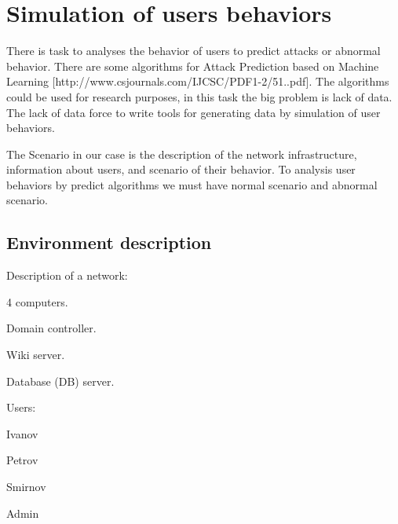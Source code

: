 %

%
%




\section{Simulation of users behaviors}
There is task to analyses the behavior of users to predict attacks or abnormal behavior. There are some algorithms for Attack Prediction based on Machine Learning [http://www.csjournals.com/IJCSC/PDF1-2/51..pdf]. The algorithms could be used for research purposes, in this task the big problem is lack of data. The lack of data force to write tools for generating data by simulation of user behaviors. 

The Scenario in our case is the description of the network infrastructure, information about users, and scenario of their behavior. To analysis user behaviors by predict algorithms we must have normal scenario and abnormal scenario.  
  
\subsection{Environment description}

Description of a network:
\begin{compactitem}
\item 4 computers.
\item Domain controller. 
\item Wiki server.
\item Database (DB) server.
\end{compactitem}
Users: 
\begin{compactitem}
\item Ivanov
\item Petrov
\item Smirnov
\item Admin
\end{compactitem}
     
